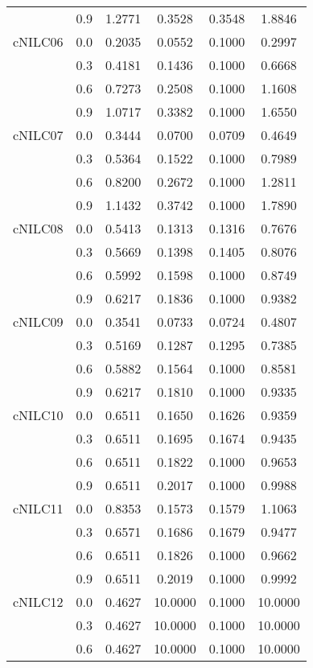 \begin{longtable}{cccccc}
        & 0.9 & 1.2771 & 0.3528 & 0.3548 & 1.8846 \\
cNILC06 & 0.0 & 0.2035 & 0.0552 & 0.1000 & 0.2997 \\
        & 0.3 & 0.4181 & 0.1436 & 0.1000 & 0.6668 \\
        & 0.6 & 0.7273 & 0.2508 & 0.1000 & 1.1608 \\
        & 0.9 & 1.0717 & 0.3382 & 0.1000 & 1.6550 \\
cNILC07 & 0.0 & 0.3444 & 0.0700 & 0.0709 & 0.4649 \\
        & 0.3 & 0.5364 & 0.1522 & 0.1000 & 0.7989 \\
        & 0.6 & 0.8200 & 0.2672 & 0.1000 & 1.2811 \\
        & 0.9 & 1.1432 & 0.3742 & 0.1000 & 1.7890 \\
cNILC08 & 0.0 & 0.5413 & 0.1313 & 0.1316 & 0.7676 \\
        & 0.3 & 0.5669 & 0.1398 & 0.1405 & 0.8076 \\
        & 0.6 & 0.5992 & 0.1598 & 0.1000 & 0.8749 \\
        & 0.9 & 0.6217 & 0.1836 & 0.1000 & 0.9382 \\
cNILC09 & 0.0 & 0.3541 & 0.0733 & 0.0724 & 0.4807 \\
        & 0.3 & 0.5169 & 0.1287 & 0.1295 & 0.7385 \\
        & 0.6 & 0.5882 & 0.1564 & 0.1000 & 0.8581 \\
        & 0.9 & 0.6217 & 0.1810 & 0.1000 & 0.9335 \\
cNILC10 & 0.0 & 0.6511 & 0.1650 & 0.1626 & 0.9359 \\
        & 0.3 & 0.6511 & 0.1695 & 0.1674 & 0.9435 \\
        & 0.6 & 0.6511 & 0.1822 & 0.1000 & 0.9653 \\
        & 0.9 & 0.6511 & 0.2017 & 0.1000 & 0.9988 \\
cNILC11 & 0.0 & 0.8353 & 0.1573 & 0.1579 & 1.1063 \\
        & 0.3 & 0.6571 & 0.1686 & 0.1679 & 0.9477 \\
        & 0.6 & 0.6511 & 0.1826 & 0.1000 & 0.9662 \\
        & 0.9 & 0.6511 & 0.2019 & 0.1000 & 0.9992 \\
cNILC12 & 0.0 & 0.4627 & 10.0000 & 0.1000 & 10.0000 \\
        & 0.3 & 0.4627 & 10.0000 & 0.1000 & 10.0000 \\
        & 0.6 & 0.4627 & 10.0000 & 0.1000 & 10.0000 \\

\end{longtable}

